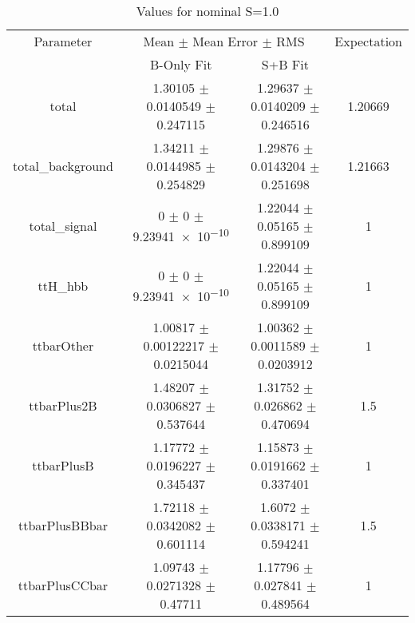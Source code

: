 \begin{table}
\centering
\caption{Values for nominal S=1.0}
\begin{tabular}{cccc}
\toprule
Parameter & \multicolumn{2}{c}{Mean $\pm$ Mean Error $\pm$ RMS} & Expectation\\
 & B-Only Fit & S+B Fit & \\
\midrule
total & \num{1.30105} $\pm$ \num{0.0140549} $\pm$ \num{0.247115} & \num{1.29637} $\pm$ \num{0.0140209} $\pm$ \num{0.246516} & \num{1.20669}\\
total\_background & \num{1.34211} $\pm$ \num{0.0144985} $\pm$ \num{0.254829} & \num{1.29876} $\pm$ \num{0.0143204} $\pm$ \num{0.251698} & \num{1.21663}\\
total\_signal & \num{0} $\pm$ \num{0} $\pm$ \num{9.23941e-10} & \num{1.22044} $\pm$ \num{0.05165} $\pm$ \num{0.899109} & \num{1}\\
ttH\_hbb & \num{0} $\pm$ \num{0} $\pm$ \num{9.23941e-10} & \num{1.22044} $\pm$ \num{0.05165} $\pm$ \num{0.899109} & \num{1}\\
ttbarOther & \num{1.00817} $\pm$ \num{0.00122217} $\pm$ \num{0.0215044} & \num{1.00362} $\pm$ \num{0.0011589} $\pm$ \num{0.0203912} & \num{1}\\
ttbarPlus2B & \num{1.48207} $\pm$ \num{0.0306827} $\pm$ \num{0.537644} & \num{1.31752} $\pm$ \num{0.026862} $\pm$ \num{0.470694} & \num{1.5}\\
ttbarPlusB & \num{1.17772} $\pm$ \num{0.0196227} $\pm$ \num{0.345437} & \num{1.15873} $\pm$ \num{0.0191662} $\pm$ \num{0.337401} & \num{1}\\
ttbarPlusBBbar & \num{1.72118} $\pm$ \num{0.0342082} $\pm$ \num{0.601114} & \num{1.6072} $\pm$ \num{0.0338171} $\pm$ \num{0.594241} & \num{1.5}\\
ttbarPlusCCbar & \num{1.09743} $\pm$ \num{0.0271328} $\pm$ \num{0.47711} & \num{1.17796} $\pm$ \num{0.027841} $\pm$ \num{0.489564} & \num{1}\\
\bottomrule
\end{tabular}
\end{table}